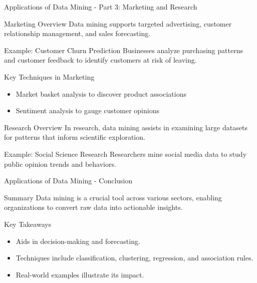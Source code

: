 \documentclass[aspectratio=169]{beamer}
\begin{document}
\begin{frame}[fragile]{Applications of Data Mining - Part 3: Marketing and Research}
    \begin{block}{Marketing Overview}
        Data mining supports targeted advertising, customer relationship management, and sales forecasting.
    \end{block}
    \begin{block}{Example: Customer Churn Prediction}
        Businesses analyze purchasing patterns and customer feedback to identify customers at risk of leaving.
    \end{block}
    \begin{block}{Key Techniques in Marketing}
        \begin{itemize}
            \item Market basket analysis to discover product associations
            \item Sentiment analysis to gauge customer opinions
        \end{itemize}
    \end{block}
    
    \begin{block}{Research Overview}
        In research, data mining assists in examining large datasets for patterns that inform scientific exploration.
    \end{block}
    \begin{block}{Example: Social Science Research}
        Researchers mine social media data to study public opinion trends and behaviors.
    \end{block}
\end{frame}

\begin{frame}[fragile]{Applications of Data Mining - Conclusion}
    \begin{block}{Summary}
        Data mining is a crucial tool across various sectors, enabling organizations to convert raw data into actionable insights.
    \end{block}
    \begin{block}{Key Takeaways}
        \begin{itemize}
            \item Aids in decision-making and forecasting.
            \item Techniques include classification, clustering, regression, and association rules.
            \item Real-world examples illustrate its impact.
        \end{itemize}
    \end{block}
\end{frame}
\end{document}
